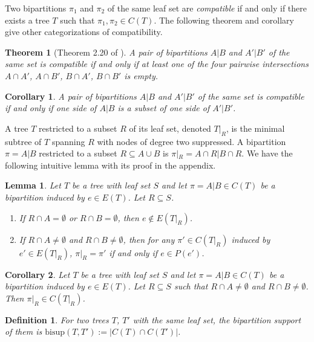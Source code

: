 \documentclass{bmcart}
\newcommand{\bs}{\mathrm{bisup}}
\newtheorem{theorem}{Theorem}
\newtheorem{lemma}{Lemma}
\newtheorem{corollary}{Corollary}
\newtheorem{definition}{Definition}
\begin{document}
Two bipartitions $\pi_1$ and $\pi_2$ of the same leaf set are \textit{compatible} if and only if there exists a tree $T$ such that $\pi_1, \pi_2 \in C(T)$. The following theorem and corollary give other categorizations of compatibility.
\begin{theorem}[Theorem 2.20 of \cite{warnow2017computational}]\label{thm:compatibility}
    A pair of bipartitions $A|B$ and $A'|B'$ of the same set is compatible if and only if at least one of the four pairwise intersections $A \cap A'$, $A\cap B'$, $B\cap A'$, $B \cap B'$ is empty. 
\end{theorem}

\begin{corollary}\label{cor:compatibility}
     A pair of bipartitions $A|B$ and $A'|B'$ of the same set is compatible if and only if one side of $A|B$ is a subset of one side of $A'|B'$.
\end{corollary}
\medskip

A tree $T$ restricted to a subset $R$ of its leaf set, denoted $T|_R$, is the minimal subtree of $T$ spanning $R$ with nodes of degree two suppressed. A bipartition $\pi = A|B$ restricted to a subset $R \subseteq A\cup B$ is $\pi|_R = A\cap R | B\cap R$. We have the following intuitive lemma with its proof in the appendix.

\begin{lemma} \label{lem:bipar_restrict_edge}
    Let $T$ be a tree with leaf set $S$ and let $\pi = A|B \in C(T)$ be a bipartition induced by $e \in E(T)$. Let $R \subseteq S$.
    \begin{enumerate}
        \item If $R \cap A = \emptyset$ or $R \cap B = \emptyset$, then $e \notin E(T|_R)$.
        \item If $R \cap A \neq \emptyset$ and $R \cap B \neq \emptyset$, then for any $\pi' \in C(T|_R)$ induced by $e' \in E(T|_R)$, $\pi|_R = \pi'$ if and only if $e \in P(e')$.
    \end{enumerate}
\end{lemma}

\begin{corollary} \label{cor:bipar_restrict}
    Let $T$ be a tree with leaf set $S$ and let $\pi = A|B \in C(T)$ be a bipartition induced by $e \in E(T)$. Let $R \subseteq S$ such that $R \cap A \neq \emptyset$ and $R \cap B \neq \emptyset$. Then $\pi|_R \in C(T|_R)$. 
\end{corollary}


\begin{definition}
For two trees $T$, $T'$ with the same leaf set, the \textit{bipartition support} of them is $\bs(T, T') := |C(T) \cap C(T')|$.
\end{definition}
\end{document}
